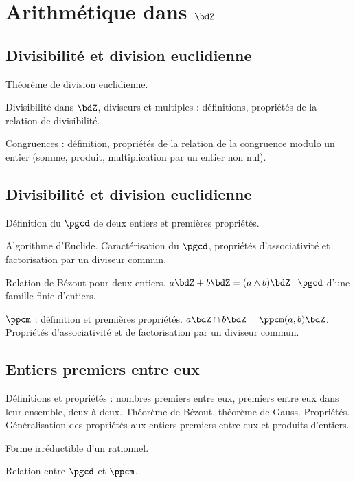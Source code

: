 \documentclass[a4paper,french,bookmarks]{article}
\begin{document}

\section*{Arithmétique dans $\bdZ$}

\subsection{Divisibilité et division euclidienne}

\begin{enumerate}
    \ithand Théorème de division euclidienne.
    
    \ithand Divisibilité dans $\bdZ$, diviseurs et multiples : définitions, propriétés de la relation de divisibilité.
    
    \ithand Congruences : définition, propriétés de la relation de la congruence modulo un entier (somme, produit, multiplication par un entier non nul).
\end{enumerate}

\subsection{Divisibilité et division euclidienne}

\begin{enumerate}
    \ithand Définition du $\pgcd$ de deux entiers et premières propriétés.
    
    \ithand Algorithme d’Euclide. Caractérisation du $\pgcd$, propriétés d’associativité et factorisation par un diviseur commun.
    
    \ithand Relation de Bézout pour deux entiers. $a\bdZ + b\bdZ = (a\land b)\bdZ$. $\pgcd$ d’une famille finie d’entiers.
    
    \ithand $\ppcm$ : définition et premières propriétés. $a\bdZ \cap b\bdZ = \ppcm(a, b)\bdZ$. Propriétés d’associativité et de factorisation par un diviseur commun.
\end{enumerate}

\subsection{Entiers premiers entre eux}

\begin{enumerate}
    \ithand Définitions et propriétés : nombres premiers entre eux, premiers entre eux dans leur ensemble, deux à deux. 
    \ithand Théorème de Bézout, théorème de Gauss. Propriétés. Généralisation des propriétés aux entiers premiers entre eux et produits d’entiers.
    
    \ithand Forme irréductible d’un rationnel.

    \ithand Relation entre $\pgcd$ et $\ppcm$.
\end{enumerate}
\end{document}
